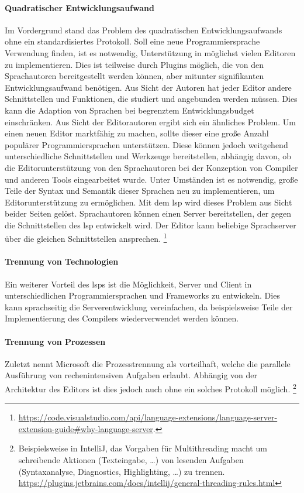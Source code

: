 \paragraph{Quadratischer Entwicklungsaufwand}
Im Vordergrund stand das Problem des quadratischen Entwicklungsaufwands ohne ein standardisiertes Protokoll.
Soll eine neue Programmiersprache Verwendung finden, ist es notwendig, Unterstützung in möglichst vielen Editoren zu implementieren.
Dies ist teilweise durch Plugins möglich, die von den Sprachautoren bereitgestellt werden können, aber mitunter signifikanten Entwicklungsaufwand benötigen.
Aus Sicht der Autoren hat jeder Editor andere Schnittstellen und Funktionen, die studiert und angebunden werden müssen.
Dies kann die Adaption von Sprachen bei begrenztem Entwicklungsbudget einschränken.
Aus Sicht der Editorautoren ergibt sich ein ähnliches Problem.
Um einen neuen Editor marktfähig zu machen, sollte dieser eine große Anzahl populärer Programmiersprachen unterstützen.
Diese können jedoch weitgehend unterschiedliche Schnittstellen und Werkzeuge bereitstellen, abhängig davon, ob die Editorunterstützung von den Sprachautoren bei der Konzeption von Compiler und anderen Tools eingearbeitet wurde.
Unter Umständen ist es notwendig, große Teile der Syntax und Semantik dieser Sprachen neu zu implementieren, um Editorunterstützung zu ermöglichen.
Mit dem \ac{lsp} wird dieses Problem aus Sicht beider Seiten gelöst.
Sprachautoren können einen Server bereitstellen, der gegen die Schnittstellen des \ac{lsp} entwickelt wird.
Der Editor kann beliebige Sprachserver über die gleichen Schnittstellen ansprechen.
\footnote{\url{https://code.visualstudio.com/api/language-extensions/language-server-extension-guide\#why-language-server}.\label{fn:why-lsp}}

\paragraph{Trennung von Technologien}
Ein weiterer Vorteil des \acp{lsp} ist die Möglichkeit, Server und Client in unterschiedlichen Programmiersprachen und Frameworks zu entwickeln.
Dies kann sprachseitig die Serverentwicklung vereinfachen, da beispielsweise Teile der Implementierung des Compilers wiederverwendet werden können.

\paragraph{Trennung von Prozessen}
Zuletzt nennt Microsoft die Prozesstrennung als vorteilhaft, welche die parallele Ausführung von rechenintensiven Aufgaben erlaubt.
Abhängig von der Architektur des Editors ist dies jedoch auch ohne ein solches Protokoll möglich.
\footnote{Beispielsweise in IntelliJ, das Vorgaben für Multithreading macht um schreibende Aktionen (Texteingabe, \ldots) von lesenden Aufgaben (Syntaxanalyse, Diagnostics, Highlighting, \ldots) zu trennen. \url{https://plugins.jetbrains.com/docs/intellij/general-threading-rules.html}}


